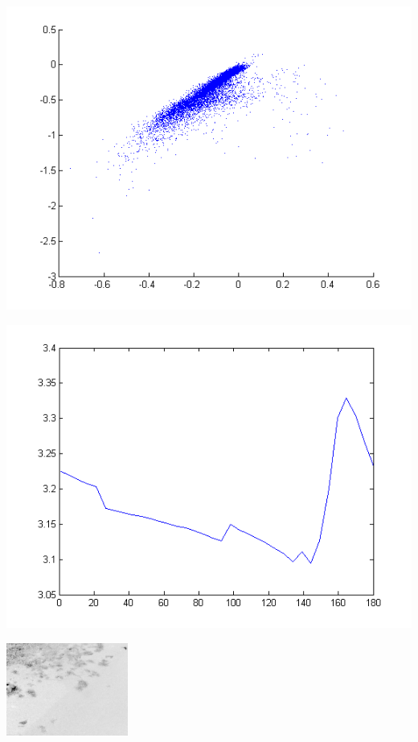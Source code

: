\documentclass[red]{beamer}
\begin{document}
\begin{frame}
\centerline{\includegraphics[width=.9\linewidth]{./img/chromaticity1}}
\end{frame}

\begin{frame}
\centerline{\includegraphics[width=.9\linewidth]{./img/chromaticity1_theta}}
\end{frame}

\begin{frame}
\centerline{\includegraphics[width=.75\linewidth]{./img/intrinsic}}
\end{frame}
\end{document}
